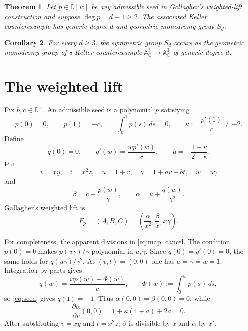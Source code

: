 \documentclass[11pt]{article}
\newtheorem{theorem}{Theorem}
\newtheorem{corollary}[theorem]{Corollary}
\theoremstyle{remark}
\newcommand{\A}{\mathbb A}
\newcommand{\C}{\mathbb C}
\begin{document}
\begin{theorem}\label{thm:main}
Let $p\in\C[w]$ be any admissible seed in Gallagher's weighted-lift
construction and suppose $\deg p=d-1\geq2$.  The associated Keller
counterexample has generic degree $d$ and geometric monodromy group $S_d$.
\end{theorem}

\begin{corollary}\label{cor:realization}
For every $d\geq3$, the symmetric group $S_d$ occurs as the geometric
monodromy group of a Keller counterexample
$\A^3_\C\to\A^3_\C$ of generic degree $d$.
\end{corollary}

\section{The weighted lift}

Fix $b,c\in\C^\times$.  An admissible seed is a polynomial $p$ satisfying
\begin{equation}
 p(0)=0,\qquad p(1)=-c,\qquad \int_0^1p(s)\,ds=0,
 \qquad \kappa:=\frac{p'(1)}c\ne-2.                 \label{eq:seed}
\end{equation}
Define
\begin{equation}
 q(0)=0,\qquad q'(w)=\frac{w p'(w)}c,\qquad
 a=-\frac{1+\kappa}{2+\kappa}.                     \label{eq:q}
\end{equation}
Put
\[
 v=xy,\quad t=x^2z,\quad u=1+v,\quad
 \gamma=1+av+bt,\quad w=u\gamma
\]
and
\[
 \beta=c+\frac{p(w)}{\gamma},\qquad
 \alpha=u+\frac{q(w)}{\gamma^2}.
\]
Gallagher's weighted lift is
\begin{equation}
 F_p=(A,B,C)=
 \left(\frac{\alpha}{x^2},\frac{\beta}{x},x\gamma\right).
                                                               \label{eq:map}
\end{equation}

For completeness, the apparent divisions in \eqref{eq:map} cancel.
The condition $p(0)=0$ makes $p(u\gamma)/\gamma$ polynomial in $u,\gamma$.
Since $q(0)=q'(0)=0$, the same holds for
$q(u\gamma)/\gamma^2$.  At $(v,t)=(0,0)$ one has $u=\gamma=w=1$.
Integration by parts gives
\begin{equation}
 q(w)=\frac{wp(w)-\Phi(w)}c,\qquad
 \Phi(w):=\int_0^w p(s)\,ds,                       \label{eq:phi}
\end{equation}
so \eqref{eq:seed} gives $q(1)=-1$.  Thus
$\alpha(0,0)=\beta(0,0)=0$, while
\[
 \frac{\partial\alpha}{\partial v}(0,0)
 =1+\kappa(1+a)+2a=0.
\]
After substituting $v=xy$ and $t=x^2z$, $\beta$ is divisible by $x$ and
$\alpha$ by $x^2$.
\end{document}
